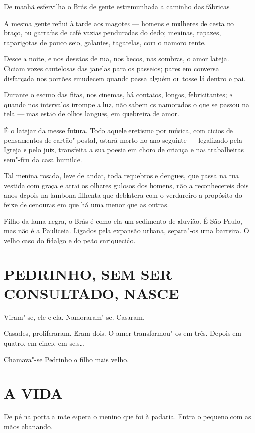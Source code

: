 De manhã esfervilha o Brás de gente estremunhada a caminho das fábricas.

A mesma gente reflui à tarde aos magotes --- homens e mulheres de cesta
no braço, ou garrafas de café vazias penduradas do dedo; meninas,
rapazes, raparigotas de pouco seio, galantes, tagarelas, com o namoro
rente.

Desce a noite, e nos desvãos de rua, nos becos, nas sombras, o amor
lateja. Ciciam vozes cautelosas das janelas para os passeios; pares em
conversa disfarçada nos portões emudecem quando passa alguém ou tosse lá
dentro o pai.

Durante o escuro das fitas, nos cinemas, há contatos, longos,
febricitantes; e quando nos intervalos irrompe a luz, não sabem os
namorados o que se passou na tela --- mas estão de olhos langues, em
quebreira de amor.

É o latejar da messe futura. Todo aquele eretismo por música, com cicios
de pensamentos de cartão"-postal, estará morto no ano seguinte ---
legalizado pela Igreja e pelo juiz, transfeita a sua poesia em choro de
criança e nas trabalheiras sem"-fim da casa humilde.

Tal menina rosada, leve de andar, toda requebros e dengues, que passa na
rua vestida com graça e atrai os olhares gulosos dos homens, não a
reconhecereis dois anos depois na lambona filhenta que deblatera com o
verdureiro a propósito do feixe de cenouras em que há uma menor que as
outras.

Filho da lama negra, o Brás é como ela um sedimento de aluvião. É São
Paulo, mas não é a Pauliceia. Ligados pela expansão urbana, separa"-os
uma barreira. O velho caso do fidalgo e do peão enriquecido.

\section*{PEDRINHO, SEM SER CONSULTADO, NASCE}

Viram"-se, ele e ela. Namoraram"-se. Casaram.

Casados, proliferaram. Eram dois. O amor transformou"-os em três. Depois
em quatro, em cinco, em seis\ldots{}

Chamava"-se Pedrinho o filho mais velho.

\section*{A VIDA}

De pé na porta a mãe espera o menino que foi à padaria. Entra o pequeno
com as mãos abanando.

